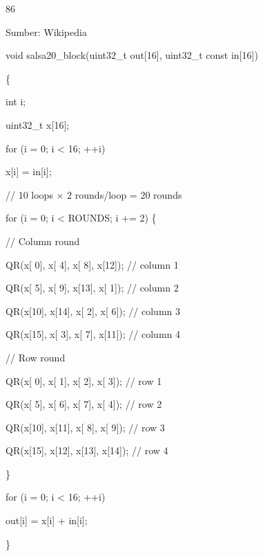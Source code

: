 \documentclass{article}
\begin{document}

86

Sumber: Wikipedia

void salsa20\_block(uint32\_t out[16], uint32\_t const in[16])

\{ 

int i;


uint32\_t x[16];


for (i = 0; i < 16; ++i)



x[i] = in[i];


// 10 loops × 2 rounds/loop = 20 rounds


for (i = 0; i < ROUNDS; i += 2) \{



// Column round



QR(x[ 0], x[ 4], x[ 8], x[12]); // column 1



QR(x[ 5], x[ 9], x[13], x[ 1]); // column 2



QR(x[10], x[14], x[ 2], x[ 6]); // column 3



QR(x[15], x[ 3], x[ 7], x[11]); // column 4



// Row round



QR(x[ 0], x[ 1], x[ 2], x[ 3]); // row 1



QR(x[ 5], x[ 6], x[ 7], x[ 4]); // row 2



QR(x[10], x[11], x[ 8], x[ 9]); // row 3



QR(x[15], x[12], x[13], x[14]); // row 4


\}


for (i = 0; i < 16; ++i)



out[i] = x[i] + in[i];

\}
\end{document}
